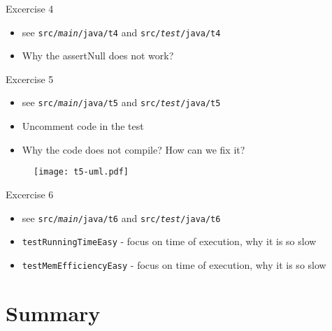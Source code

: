 \documentclass{beamer}
\begin{document}
\begin{frame}{Excercise 4}

\begin{itemize}
    \item see \texttt{src/\textit{main}/java/t4} and \texttt{src/\textit{test}/java/t4}
    \item Why the assertNull does not work?
\end{itemize}
\end{frame}

\begin{frame}{Excercise 5}

\begin{itemize}
    \item see \texttt{src/\textit{main}/java/t5} and \texttt{src/\textit{test}/java/t5}
    \item Uncomment code in the test
    \item Why the code does not compile? How can we fix it?
\end{itemize}
    \begin{figure}[htbp]
    \centering
        \texttt{[image: t5-uml.pdf]}
    \label{fig:t5-uml}
    \end{figure}
\end{frame}

\begin{frame}{Excercise 6}

\begin{itemize}
    \item see \texttt{src/\textit{main}/java/t6} and \texttt{src/\textit{test}/java/t6}
    \item \texttt{testRunningTimeEasy} - focus on time of execution, why it is so slow
    \item \texttt{testMemEfficiencyEasy} - focus on time of execution, why it is so slow
\end{itemize}
\end{frame}

\section{Summary}
\end{document}
